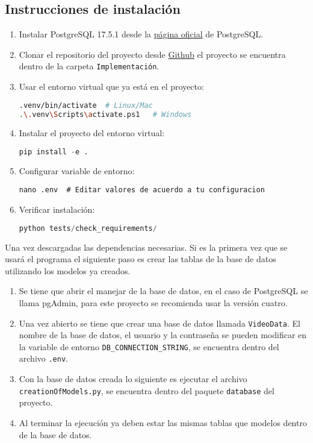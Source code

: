 	\subsection{Instrucciones de instalaci\'on}
	\begin{enumerate}
		\item Instalar PostgreSQL 17.5.1 desde la \href{https://www.postgresql.org/download/}{p\'agina oficial} de PostgreSQL.
		\item Clonar el repositorio del proyecto desde \href{https://github.com/Ic3manMtz/Servicio-Social.git}{Github} el proyecto se encuentra dentro de la carpeta \texttt{Implementaci\'on}.
		\item Usar el entorno virtual que ya está en el proyecto:
		\begin{lstlisting}[language=bash]
.venv/bin/activate  # Linux/Mac
.\.venv\Scripts\activate.ps1   # Windows
		\end{lstlisting}
		

		\item Instalar el proyecto del entorno virtual:
		\begin{lstlisting}[language=python]
pip install -e .
		\end{lstlisting}
		\item Configurar variable de entorno:
		\begin{lstlisting}
nano .env  # Editar valores de acuerdo a tu configuracion
		\end{lstlisting}
		\item Verificar instalaci\'on:
		\begin{lstlisting}[language=python]
python tests/check_requirements/
		\end{lstlisting}
	\end{enumerate}

\noindent Una vez descargadas las dependencias necesarias. Si es la primera vez que se usará el programa el siguiente paso es crear las tablas de la base de datos utilizando los modelos ya creados.
\begin{enumerate}
	\item Se tiene que abrir el manejar de la base de datos, en el caso de PostgreSQL se llama pgAdmin, para este proyecto se recomienda usar la versión cuatro.
	\item Una vez abierto se tiene que crear una base de datos llamada \texttt{VideoData}. El nombre de la base de datos, el usuario y la contraseña se pueden modificar en la variable de entorno \texttt{DB\_CONNECTION\_STRING}, se encuentra dentro del archivo \texttt{.env}.
	\item Con la base de datos creada lo siguiente es ejecutar el archivo \texttt{creationOfModels.py}, se encuentra dentro del paquete \texttt{database} del proyecto.
	\item Al terminar la ejecución ya deben estar las mismas tablas que modelos dentro de la base de datos.
\end{enumerate}

